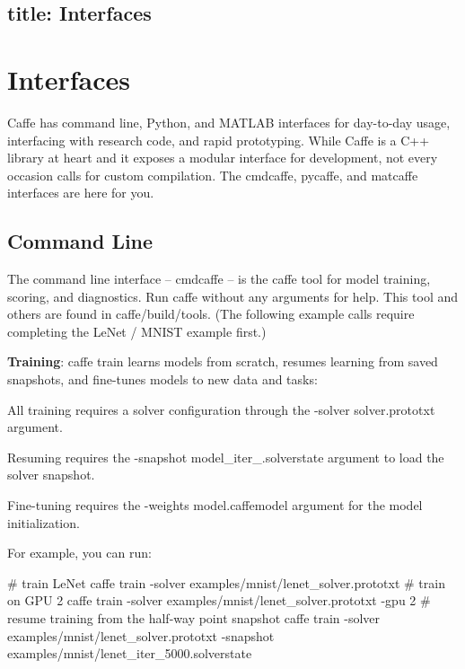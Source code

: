 

 \subsection*{title\+: Interfaces }

\section*{Interfaces}

Caffe has command line, Python, and M\+A\+T\+L\+AB interfaces for day-\/to-\/day usage, interfacing with research code, and rapid prototyping. While Caffe is a C++ library at heart and it exposes a modular interface for development, not every occasion calls for custom compilation. The cmdcaffe, pycaffe, and matcaffe interfaces are here for you.

\subsection*{Command Line}

The command line interface -- cmdcaffe -- is the {\ttfamily caffe} tool for model training, scoring, and diagnostics. Run {\ttfamily caffe} without any arguments for help. This tool and others are found in caffe/build/tools. (The following example calls require completing the Le\+Net / M\+N\+I\+ST example first.)

{\bfseries Training}\+: {\ttfamily caffe train} learns models from scratch, resumes learning from saved snapshots, and fine-\/tunes models to new data and tasks\+:


\begin{DoxyItemize}
\item All training requires a solver configuration through the {\ttfamily -\/solver solver.\+prototxt} argument.
\item Resuming requires the {\ttfamily -\/snapshot model\+\_\+iter\+\_.\+solverstate} argument to load the solver snapshot.
\item Fine-\/tuning requires the {\ttfamily -\/weights model.\+caffemodel} argument for the model initialization.
\end{DoxyItemize}

For example, you can run\+: \begin{DoxyVerb}# train LeNet
caffe train -solver examples/mnist/lenet_solver.prototxt
# train on GPU 2
caffe train -solver examples/mnist/lenet_solver.prototxt -gpu 2
# resume training from the half-way point snapshot
caffe train -solver examples/mnist/lenet_solver.prototxt -snapshot examples/mnist/lenet_iter_5000.solverstate
\end{DoxyVerb}


